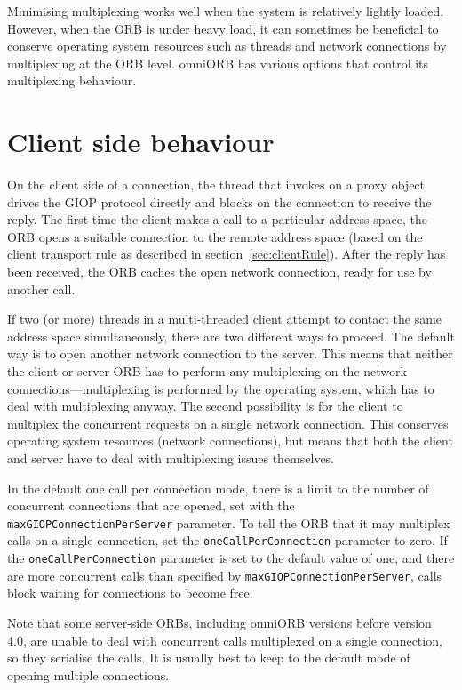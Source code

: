 \documentclass[11pt,oneside,a4paper]{book}
\newcommand{\code}[1]{\texttt{#1}}
\newcommand{\dsc}{\discretionary{}{}{}}
\begin{document}
Minimising multiplexing works well when the system is relatively
lightly loaded. However, when the ORB is under heavy load, it can
sometimes be beneficial to conserve operating system resources such as
threads and network connections by multiplexing at the ORB
level. omniORB has various options that control its multiplexing
behaviour.


\section{Client side behaviour}

On the client side of a connection, the thread that invokes on a proxy
object drives the GIOP protocol directly and blocks on the connection
to receive the reply. The first time the client makes a call to a
particular address space, the ORB opens a suitable connection to the
remote address space (based on the client transport rule as described
in section~\ref{sec:clientRule}). After the reply has been received,
the ORB caches the open network connection, ready for use by another
call.

If two (or more) threads in a multi-threaded client attempt to contact
the same address space simultaneously, there are two different ways to
proceed. The default way is to open another network connection to the
server. This means that neither the client or server ORB has to
perform any multiplexing on the network connections---multiplexing is
performed by the operating system, which has to deal with multiplexing
anyway. The second possibility is for the client to multiplex the
concurrent requests on a single network connection. This conserves
operating system resources (network connections), but means that both
the client and server have to deal with multiplexing issues
themselves.

In the default one call per connection mode, there is a limit to the
number of concurrent connections that are opened, set with the
\code{maxGIOPConnection\dsc{}PerServer} parameter. To tell the ORB
that it may multiplex calls on a single connection, set the
\code{oneCallPerConnection} parameter to zero. If the
\code{oneCallPer\dsc{}Connection} parameter is set to the default
value of one, and there are more concurrent calls than specified by
\code{maxGIOPConnectionPerServer}, calls block waiting for connections
to become free.

Note that some server-side ORBs, including omniORB versions before
version 4.0, are unable to deal with concurrent calls multiplexed on a
single connection, so they serialise the calls. It is usually best to
keep to the default mode of opening multiple connections.
\end{document}
